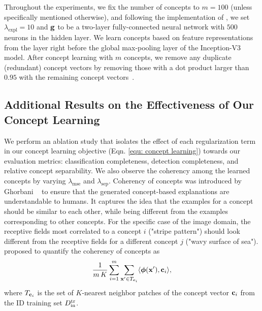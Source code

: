 Throughout the experiments, we fix the number of concepts to $m = 100$ (unless specifically mentioned otherwise), and following the implementation of \cite{yeh2020completeness}, we set $\lambda_{\textrm{expl}} = 10$ and $\mathbf{g}$ to be a two-layer fully-connected neural network with $500$ neurons in the hidden layer.
We learn concepts based on feature representations from the layer right before the global max-pooling layer of the Inception-V3 model.
After concept learning with $m$ concepts, we remove any duplicate (redundant) concept vectors by removing those with a dot product larger than $0.95$ with the remaining concept vectors~\cite{yeh2020completeness}.


\subsection{Additional Results on the Effectiveness of Our Concept Learning}
\label{sec:app_addi_results}

\label{sec:appendix-concept-learning-ablation}
We perform an ablation study that isolates the effect of each regularization term in our concept learning objective (Eqn. \ref{equ: concept learning}) towards our evaluation metrics: classification completeness, detection completeness, and relative concept separability. 
We also observe the coherency among the learned concepts by varying $\lambda_\textrm{mse}$ and $\lambda_\textrm{sep}$.
Coherency of concepts was introduced by Ghorbani \etal~\cite{ghorbani2019ace} to ensure that the generated concept-based explanations are understandable to humans. 
It captures the idea that the examples for a concept should be similar to each other, while being different from the examples corresponding to other concepts.
For the specific case of the image domain, the receptive fields most correlated to a concept $i$ (\eg "stripe pattern") should look different from the receptive fields for a different concept $j$ (\eg "wavy surface of sea").
\citet{yeh2020completeness} proposed to quantify the coherency of concepts as 
\begin{equation}
\label{eq:coherency}
    \frac{1}{m\,K} \displaystyle\sum\limits_{i=1}^m \displaystyle\sum\limits_{\mathbf{x}^\prime \in T_{\mathbf{c}_i}} \langle \bm{\phi}(\mathbf{x}^\prime), \mathbf{c}_i \rangle,
\end{equation}
where $T_{\mathbf{c}_i}$ is the set of $K$-nearest neighbor patches of the concept vector $\mathbf{c}_i$ from the ID training set $D_{\textrm{in}}^{\textrm{tr}}$.

